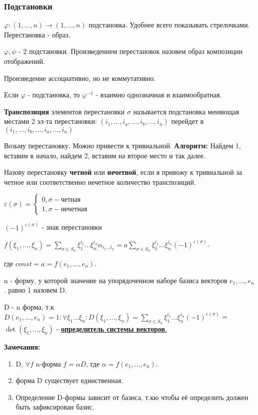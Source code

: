\subsubsection{Подстановки}

\(\varphi: (1, \ldots,n) \rightarrow (1,\ldots,n)\) подстановка. Удобнее всего показывать стрелочками. Перестановка - образ.

\(\varphi,\psi \) - 2 подстановки. Произведением перестановок назовем образ композиции отображений.

Произведение ассоциативно, но не коммутативно.

Если $\varphi $ - подстановка, то $\varphi^{-1}$ - взаимно однозначная и взаимообратная.

\textbf{Транспозиция} элементов перестановки \(\sigma\) называется подстановка меняющая местами 2 эл-та перестановки: \((i_1,\ldots,i_a,\ldots,i_b,\ldots,i_n)\)
перейдет в \((i_1,\ldots,i_b,\ldots,i_a,\ldots,i_n)\)

Возьму перестановку. Можно привести к тривиальной. \textbf{Алгоритм:} Найдем 1, вставим в начало, найдем 2, вставим на второе место и так далее.

Назову перестановку \textbf{четной} или \textbf{нечетной}, если я привожу к тривиальной за четное или соответственно нечетное количество транспозиций.

\(\varepsilon(\sigma) = \begin{cases}
    0, \sigma - \text{четная} \\
    1, \sigma - \text{нечетная}
\end{cases}\)

\((-1)^{\varepsilon(\sigma)}\) - знак перестановки

\(f(\xi_1,\ldots,\xi_n) = \sum\limits_{\sigma \in S_n} \xi_1^{i_1}\ldots\xi_n^{i_n} \alpha_{i_1\ldots i_n} = a \sum\limits_{\sigma \in S_n} \xi_1^{i_1} \ldots \xi_n^{i_n} (-1)^{\varepsilon(\sigma)}\).

где \(const = a = f(e_1,\ldots, e_n)\).

n - форму, у которой значение на упорядоченном наборе базиса векторов \(e_1,\ldots,e_n\). равно 1 назовем D.

D - n форма, т.к \(D(e_1,\ldots,e_n) = 1: \forall \xi_1 \ldots \xi_n: D(\xi_1,\ldots, \xi_n) = \sum\limits_{\sigma \in S_n} \xi_1^{i_1} \ldots \xi_n^{i_n} (-1)^{\varepsilon(\sigma)}\) = \(\det (\xi_1,\ldots, \xi_n)\) - \uline{\textbf{определитель системы векторов}.}

\textbf{Замечания:}
\begin{enumerate}
    \item D, \(\forall f\) n-форма  \(f = \alpha D\), где $\alpha = f(e_1,\ldots,e_n)$.
    \item форма D существует единственная.
    \item Определение D-формы зависит от базиса, т.кю чтобы её определить должен быть зафиксирован базис.
\end{enumerate}

